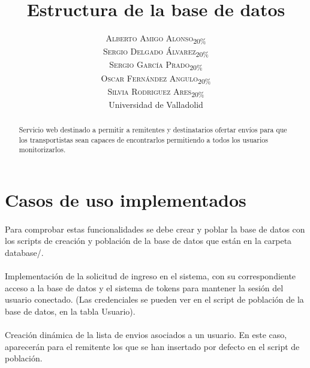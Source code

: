 \documentclass[10pt, a4paper,spanish]{article}
\title{\vspace{-15mm}\fontsize{24pt}{10pt}\selectfont\textbf{Estructura de la base de datos}} %
\author{
\large
\textsc{Alberto Amigo Alonso\textsubscript{20\%}}\\[2mm] %
\textsc{Sergio Delgado Álvarez\textsubscript{20\%}}\\[2mm] %
\textsc{Sergio García Prado\textsubscript{20\%}}\\[2mm] %
\textsc{Oscar Fernández Angulo\textsubscript{20\%}}\\[2mm] %
\textsc{Silvia Rodriguez Ares\textsubscript{20\%}}\\[2mm] %
\normalsize Universidad de Valladolid \\ %
\vspace{-5mm}
}
\date{}
\begin{document}
	\maketitle %

	\thispagestyle{fancy} %


	\begin{abstract}
		\noindent Servicio web destinado a permitir a remitentes y destinatarios ofertar envíos para que los transportistas sean capaces de encontrarlos permitiendo a todos los usuarios monitorizarlos.
	\end{abstract}

	\section{Casos de uso implementados}

		\paragraph{}
		Para comprobar estas funcionalidades se debe crear y poblar la base de datos con los scripts de creación y población de la base de datos que están en la carpeta database/.

		\paragraph{}
		Implementación de la solicitud de ingreso en el sistema, con su correspondiente acceso a la base de datos y el sistema de tokens para mantener la sesión del usuario conectado. (Las credenciales se pueden ver en el script de población de la base de datos, en la tabla Usuario).

		\paragraph{}
		Creación dinámica de la lista de envios asociados a un usuario. En este caso, aparecerán para el remitente los que se han insertado por defecto en el script de población.
\end{document}
